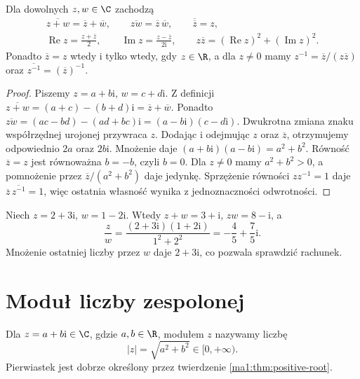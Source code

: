 \begin{twierdzenie}
\label{ma1:thm:conjugation-properties}
Dla dowolnych $z,w\in\C$ zachodzą
\[
\begin{gathered}
 \overline{z+w}=\overline z+\overline w,\qquad
 \overline{zw}=\overline z\,\overline w,\qquad
 \overline{\overline z}=z,\\
 \operatorname{Re}z=\frac{z+\overline z}{2},\qquad
 \operatorname{Im}z=\frac{z-\overline z}{2\mathrm i},\qquad
 z\overline z=(\operatorname{Re}z)^2+(\operatorname{Im}z)^2.
\end{gathered}
\]
Ponadto $\overline z=z$ wtedy i tylko wtedy, gdy $z\in\R$, a dla $z\ne0$ mamy $z^{-1}=\overline z/(z\overline z)$ oraz $\overline{z^{-1}}=(\overline z)^{-1}$.
\end{twierdzenie}
\begin{proof}
Piszemy $z=a+b\mathrm i$, $w=c+d\mathrm i$. Z definicji
$\overline{z+w}=(a+c)-(b+d)\mathrm i=\overline z+\overline w$.
Ponadto
$\overline{zw}=(ac-bd)-(ad+bc)\mathrm i=(a-b\mathrm i)(c-d\mathrm i)$.
Dwukrotna zmiana znaku współrzędnej urojonej przywraca $z$.
Dodając i odejmując $z$ oraz $\overline z$, otrzymujemy odpowiednio $2a$ oraz $2b\mathrm i$. Mnożenie daje
$(a+b\mathrm i)(a-b\mathrm i)=a^2+b^2$.
Równość $\overline z=z$ jest równoważna $b=-b$, czyli $b=0$. Dla $z\ne0$ mamy $a^2+b^2>0$, a pomnożenie przez $\overline z/(a^2+b^2)$ daje jedynkę. Sprzężenie równości $zz^{-1}=1$ daje $\overline z\,\overline{z^{-1}}=1$, więc ostatnia własność wynika z jednoznaczności odwrotności.
\end{proof}
\begin{przyklad}
Niech $z=2+3\mathrm i$, $w=1-2\mathrm i$. Wtedy $z+w=3+\mathrm i$, $zw=8-\mathrm i$, a
\[
 \frac zw=\frac{(2+3\mathrm i)(1+2\mathrm i)}{1^2+2^2}
 =-\frac45+\frac75\mathrm i.
\]
Mnożenie ostatniej liczby przez $w$ daje $2+3\mathrm i$, co pozwala sprawdzić rachunek.
\end{przyklad}

\section{Moduł liczby zespolonej}
\begin{definicja}
\label{ma1:def:complex-modulus}
Dla $z=a+b\mathrm i\in\C$, gdzie $a,b\in\R$, modułem $z$ nazywamy liczbę
\[
 |z|=\sqrt{a^2+b^2}\in[0,+\infty).
\]
Pierwiastek jest dobrze określony przez twierdzenie \ref{ma1:thm:positive-root}.
\end{definicja}

